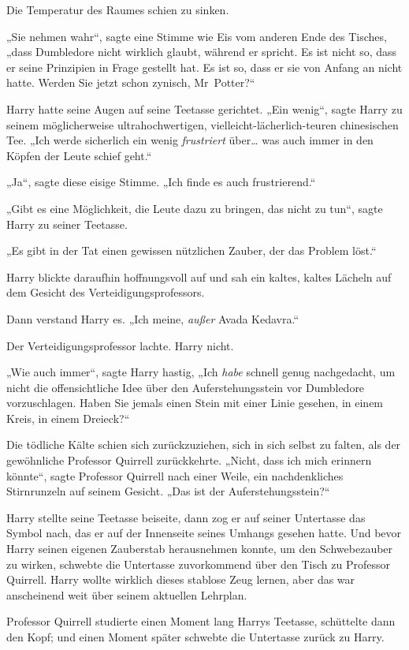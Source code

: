 {Die Temperatur des Raumes schien zu sinken.

„Sie nehmen wahr“, sagte eine Stimme wie Eis vom anderen Ende des Tisches, „dass Dumbledore nicht wirklich glaubt, während er spricht. Es ist nicht so, dass er seine Prinzipien in Frage gestellt hat. Es ist so, dass er sie von Anfang an nicht hatte. Werden Sie jetzt schon zynisch, Mr~Potter?“

Harry hatte seine Augen auf seine Teetasse gerichtet. „Ein wenig“, sagte Harry zu seinem möglicherweise ultrahochwertigen, vielleicht-lächerlich-teuren chinesischen Tee. „Ich werde sicherlich ein wenig \emph{frustriert} über… was auch immer in den Köpfen der Leute schief geht.“

„Ja“, sagte diese eisige Stimme. „Ich finde es auch frustrierend.“

„Gibt es eine Möglichkeit, die Leute dazu zu bringen, das nicht zu tun“, sagte Harry zu seiner Teetasse.

„Es gibt in der Tat einen gewissen nützlichen Zauber, der das Problem löst.“

Harry blickte daraufhin hoffnungsvoll auf und sah ein kaltes, kaltes Lächeln auf dem Gesicht des Verteidigungsprofessors.

Dann verstand Harry es. „Ich meine, \emph{außer} Avada Kedavra.“

Der Verteidigungsprofessor lachte. Harry nicht.

„Wie auch immer“, sagte Harry hastig, „Ich \emph{habe} schnell genug nachgedacht, um nicht die offensichtliche Idee über den Auferstehungsstein vor Dumbledore vorzuschlagen. Haben Sie jemals einen Stein mit einer Linie gesehen, in einem Kreis, in einem Dreieck?“

Die tödliche Kälte schien sich zurückzuziehen, sich in sich selbst zu falten, als der gewöhnliche Professor Quirrell zurückkehrte. „Nicht, dass ich mich erinnern könnte“, sagte Professor Quirrell nach einer Weile, ein nachdenkliches Stirnrunzeln auf seinem Gesicht. „Das ist der Auferstehungsstein?“

Harry stellte seine Teetasse beiseite, dann zog er auf seiner Untertasse das Symbol nach, das er auf der Innenseite seines Umhangs gesehen hatte. Und bevor Harry seinen eigenen Zauberstab herausnehmen konnte, um den Schwebezauber zu wirken, schwebte die Untertasse zuvorkommend über den Tisch zu Professor Quirrell. Harry wollte wirklich dieses stablose Zeug lernen, aber das war anscheinend weit über seinem aktuellen Lehrplan.

Professor Quirrell studierte einen Moment lang Harrys Teetasse, schüttelte dann den Kopf; und einen Moment später schwebte die Untertasse zurück zu Harry.

}
